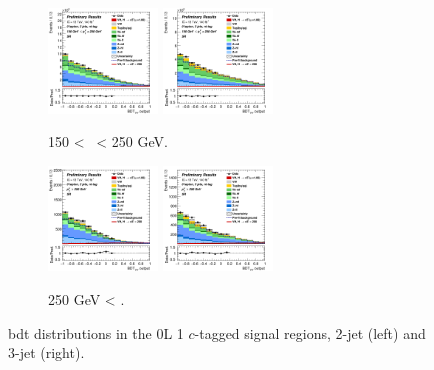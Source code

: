 \begin{figure}[h!]
    \centering
    \begin{subfigure}[b]{\textwidth}
        \centering
        \includegraphics[width=0.32\textwidth]{Images/VH/Own_fit/postfit_VHcc/Region_distmva_BMax250_BMin150_DSR_J2_TTypent_T1_L0_Y6051_GlobalFit_conditionnal_mu1.png}
        \includegraphics[width=0.32\textwidth]{Images/VH/Own_fit/postfit_VHcc/Region_distmva_BMax250_BMin150_DSR_J3_TTypent_T1_L0_Y6051_GlobalFit_conditionnal_mu1.png}
        \caption{150 < \ptv\ < 250 GeV.}
        \label{fig:plots_VHcc_OL_150_SR_1c}
    \end{subfigure}
    \begin{subfigure}[b]{\textwidth}
        \centering
        \includegraphics[width=0.32\textwidth]{Images/VH/Own_fit/postfit_VHcc/Region_distmva_BMin250_DSR_J2_TTypent_T1_L0_Y6051_GlobalFit_conditionnal_mu1.png}
        \includegraphics[width=0.32\textwidth]{Images/VH/Own_fit/postfit_VHcc/Region_distmva_BMin250_DSR_J3_TTypent_T1_L0_Y6051_GlobalFit_conditionnal_mu1.png}
        \caption{250 GeV < \ptv.}
        \label{fig:plots_VHcc_OL_250_SR_1c}
    \end{subfigure}
    \caption{\gls{bdt} distributions in the 0L 1 $c$-tagged signal regions, 2-jet (left) and 3-jet (right).}
    \label{fig:plots_VHcc_OL_SR_1c}
\end{figure} 

